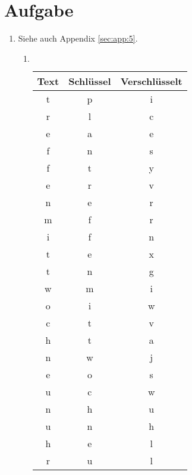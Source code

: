 \documentclass[DIN, pagenumber=false, fontsize=11pt, parskip=half]{scrartcl}
\begin{document}
    \section{Aufgabe}
    \begin{enumerate}[label=\alph*)]
        \item 
            Siehe auch Appendix \ref{sec:app:5}.
            \begin{enumerate}[label=\alph*)]
                \item $ $
                    \begin{table}[H]
                        \centering
                        \begin{tabular}{ccc}
                            \toprule
                            Text & Schlüssel & Verschlüsselt \\
                            \midrule
                            t & p & i \\
                            r & l & c \\
                            e & a & e \\
                            f & n & s \\
                            f & t & y \\
                            e & r & v \\
                            n & e & r \\
                            m & f & r \\
                            i & f & n \\
                            t & e & x \\
                            t & n & g \\
                            w & m & i \\
                            o & i & w \\
                            c & t & v \\
                            h & t & a \\
                            n & w & j \\
                            e & o & s \\
                            u & c & w \\
                            n & h & u \\
                            u & n & h \\
                            h & e & l \\
                            r & u & l \\

\end{tabular}
\end{table}
\end{enumerate}
\end{enumerate}
\end{document}
